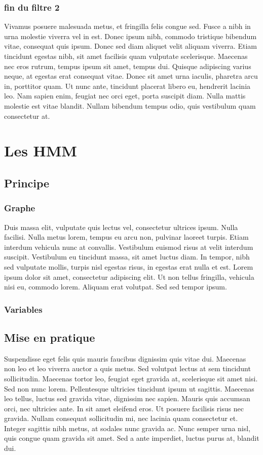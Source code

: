 \documentclass[a4paper,12pt]{report} %
\begin{document}
        \subsection{fin du filtre 2}
        	Vivamus posuere malesuada metus, et fringilla felis congue sed. Fusce a nibh in urna molestie viverra vel in est. Donec ipsum nibh, commodo tristique bibendum vitae, consequat quis ipsum. Donec sed diam aliquet velit aliquam viverra. Etiam tincidunt egestas nibh, sit amet facilisis quam vulputate scelerisque. Maecenas nec eros rutrum, tempus ipsum sit amet, tempus dui. Quisque adipiscing varius neque, at egestas erat consequat vitae. Donec sit amet urna iaculis, pharetra arcu in, porttitor quam. Ut nunc ante, tincidunt placerat libero eu, hendrerit lacinia leo. Nam sapien enim, feugiat nec orci eget, porta suscipit diam. Nulla mattis molestie est vitae blandit. Nullam bibendum tempus odio, quis vestibulum quam consectetur at. 
    \chapter{Les HMM}
        \section{Principe}
            \subsection{Graphe}
            	Duis massa elit, vulputate quis lectus vel\cite{ref1}, consectetur ultrices ipsum. Nulla facilisi. Nulla metus lorem, tempus eu arcu non, pulvinar laoreet turpis. Etiam interdum vehicula nunc at convallis. Vestibulum euismod risus at velit interdum suscipit. Vestibulum eu tincidunt massa, sit amet luctus diam. In tempor, nibh sed vulputate mollis, turpis nisl egestas risus, in egestas erat nulla et est. Lorem ipsum dolor sit amet, consectetur adipiscing elit. Ut non tellus fringilla, vehicula nisi eu, commodo lorem. Aliquam erat volutpat. Sed sed tempor ipsum.
            \subsection{Variables}
        \section{Mise en pratique}
        	Suspendisse eget felis quis mauris faucibus dignissim quis vitae dui\cite{ref1}. Maecenas non leo et leo viverra auctor a quis metus. Sed volutpat lectus at sem tincidunt sollicitudin. Maecenas tortor leo, feugiat eget gravida at, scelerisque sit amet nisi. Sed non nunc lorem. Pellentesque ultricies tincidunt ipsum ut sagittis. Maecenas leo tellus, luctus sed gravida vitae\cite{ref2}, dignissim nec sapien. Mauris quis accumsan orci, nec ultricies ante. In sit amet eleifend eros. Ut posuere facilisis risus nec gravida. Nullam consequat sollicitudin mi, nec lacinia quam consectetur et. Integer sagittis nibh metus, at sodales nunc gravida ac. Nunc semper urna nisl, quis congue quam gravida sit amet. Sed a ante imperdiet, luctus purus at, blandit dui.
\end{document}
